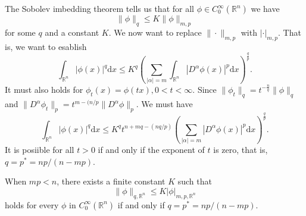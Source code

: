 The Sobolev imbedding theorem tells us that for all $\phi \in  C_0^{\infty}\left( \mathbb{R}^{n} \right) $ we have 
\[
\|\phi\|_q \le K \|\phi\|_{m,p}
\] 
for some $q$ and a constant $K$. We now want to replace $\|\cdot \|_{m,p}$ with $\left| \cdot  \right| _{m,p}$. That is, we want to esablish
\[
  \int_{\mathbb{R}^{n}}\left| \phi(x) \right| ^{q}\mathrm{d}x\le K^{q}\left( \sum_{\left| \alpha \right| =m} \int_{\mathbb{R}^{n}}\left| D^{\alpha}\phi(x) \right| ^{p}\mathrm{d}x \right) ^{\frac{q}{p}}
  .
\] 
It must also holds for $\phi_{t}(x)=\phi(tx),0<t<\infty$. Since $\|\phi_t\|_{q}=t ^{-\frac{n}{q}}\|\phi\|_{q}$ and $\|D^{\alpha}\phi_t\|_{p}=t ^{m-(n\slash p}\|D^{\alpha}\phi\|_{p}$. We must have
\[
  \int_{\mathbb{R}^{n}}\left| \phi(x) \right| ^{q}\mathrm{d}x\le K^{q}t ^{n+mq-(nq\slash p)}\left( \sum_{\left| \alpha \right| =m} \left| D^{\alpha}\phi(x) \right| ^{p}\mathrm{d}x \right)^{\frac{q}{p}}. 
\] 
It is posiible for all $t>0$ if and only if the exponent of $t$ is zero, that is, $q=p^{\ast}=np\slash(n-mp)$.
\begin{theorem}
  When $mp<n$, there exists a finite constant $K$ such that 
  \[
    \|\phi\|_{q,\mathbb{R}^{n}}\le K \left| \phi \right| _{m,p,\mathbb{R}^{n}}
  \] 
  holds for every $\phi$ in $C_0^{\infty}\left( \mathbb{R}^{n} \right) $ if and only if $q=p^{*}=np\slash\left( n-mp \right) $.
\end{theorem}
